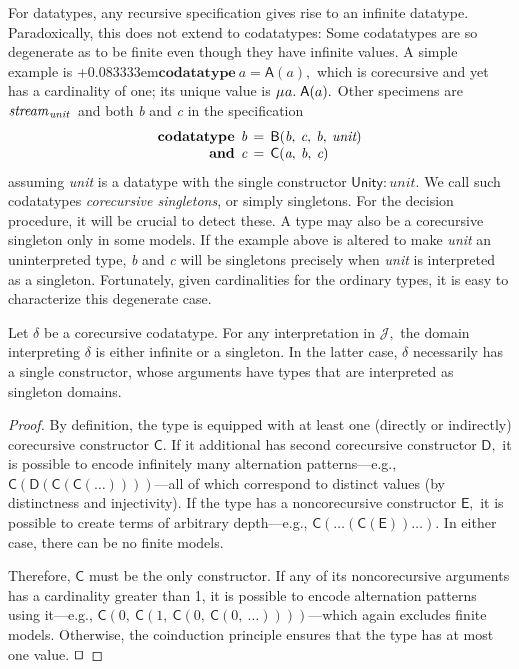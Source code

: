 \documentclass[smallcondensed,draft]{svjour3}
\newcommand\MU{\vvthinspace\mu\vvthinspace}
\newcommand\afterDot{\;} %
\newcommand\keyw[1]{\textbf{#1}}
\newcommand\const[1]{\textsf{#1}}
\newcommand\ty[1]{\textit{#1}}
\newcommand\xqed{{\hfill$\scriptstyle\squareforqed$}}
\newcommand{\JJJJ}{\mathcal{\!J\!}}
\newcommand\vvthinspace{\kern+0.041667em}
\newcommand\vthinspace{\kern+0.083333em}
\begin{document}
For datatypes, any recursive specification gives rise to an infinite datatype.
Paradoxically, this does not extend to codatatypes:
Some codatatypes are so degenerate as to be finite even though they
have infinite values. A simple example is
\vthinspace$\keyw{codatatype}~\ty{a} = \const{A}(\ty{a}),$ which is corecursive
and yet has a cardinality of one;
its unique value is $\MU a.\; \const{A}(a).$ Other specimens are
$\ty{stream}_{\vthinspace\ty{unit}\,}$
and both \ty{b} and \ty{c} in the specification
\[\begin{aligned}[t]
      \keyw{codatatype}\;\, \ty{b} & \,=\, \const{B}(\ty{b},\: \ty{c},\: \ty{b},\: \ty{unit}) \\[-1\jot]
      \keyw{and}\;\, \ty{c} & \,=\, \const{C}(\ty{a},\: \ty{b},\: \ty{c})
\end{aligned}
\]
assuming \ty{unit} is a datatype with the single constructor $\const{Unity} :
\ty{unit}.$ We call such codatatypes
\emph{corecursive singletons}, or simply singletons.
For the decision procedure, it will be
crucial to detect these. %
A type may also be a corecursive singleton only in some models. If the example
above is altered to make \ty{unit} an uninterpreted type, \ty{b} and \ty{c} will be
singletons precisely when \ty{unit} is interpreted as a singleton.
Fortunately, given cardinalities for the ordinary types,
it is easy to characterize this degenerate case.


\begin{lemma}%
\label{lem:corecursive-singletons}%
\afterDot
Let $\delta$ be a corecursive codatatype. For any interpretation in $\JJJJ,$
the domain interpreting $\delta$ is either infinite or a singleton. In the
latter case, $\delta$ necessarily has a single constructor, whose arguments have
types that are interpreted as singleton domains.
\end{lemma}

\begin{proof}
By definition, the type is equipped with at least one (directly or indirectly)
corecursive constructor $\const{C}.$ If it additional has second
corecursive constructor $\const{D},$ it is possible to encode infinitely many
alternation patterns---e.g.,
$\const{C}(\const{D}(\const{C}(\const{C}(\ldots))))$---all of which correspond
to distinct values (by distinctness and injectivity). If the type has a
noncorecursive constructor $\const{E},$ it is possible to create terms of
arbitrary depth---e.g., $\const{C}(\ldots(\const{C}(\const{E}))\ldots).$ In
either case, there can be no finite models.

Therefore, $\const{C}$ must be the only constructor.
If any of its noncorecursive arguments has a cardinality greater than 1,
it is possible to encode alternation patterns using it---e.g.,
$\const{C}(0,\: \const{C}(1,\: \const{C}(0,\: \const{C}(0,\: \ldots))))$---which
again excludes finite models. Otherwise, the coinduction principle ensures
that the type has at most one value.
\xqed
\end{proof}
\end{document}
